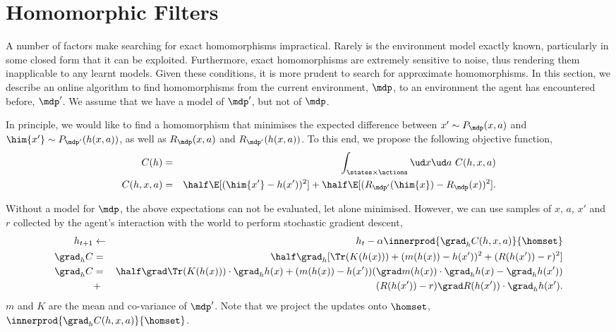 \section{Homomorphic Filters}
\label{sec:hf:homomorphic-filters}

A number of factors make searching for exact homomorphisms impractical.
Rarely is the environment model exactly known, particularly in some
closed form that it can be exploited. Furthermore, exact homomorphisms
are extremely sensitive to noise, thus rendering them inapplicable to
any learnt models. Given these conditions, it is more prudent to search
for approximate homomorphisms. In this section, we describe an online
algorithm to find homomorphisms from the current environment, $\mdp$, to
an environment the agent has encountered before, $\mdp'$. We assume that
we have a model of $\mdp'$, but not of $\mdp$. 


In principle, we would like to find a homomorphism that minimises the
expected difference between $x' \sim P_{\mdp}(x,a)$ and $\him{x'} \sim
P_{\mdp'}(h(x,a))$, as well as $R_{\mdp}(x,a)$ and $R_{\mdp'}(h(x,a))$.
To this end, we propose the following objective function,
\begin{eqnarray}
  C(h) &=& \int_{\states \times \actions} \ud x \ud a ~ C(h,x,a) \label{eq:hf:cost}\\
  C(h,x,a) &=& \half \E[ (\him{x'} - h(x'))^2 ] + \half \E[ (R_{\mdp'}(\him{x}) - R_{\mdp}(x))^2 ] \nonumber.
\end{eqnarray}

Without a model for $\mdp$, the above expectations can not be evaluated,
let alone minimised. However, we can use samples of $x$, $a$, $x'$ and
$r$ collected by the agent's interaction with the world to perform
stochastic gradient descent,
\begin{eqnarray*}
  h_{t+1} &\gets& h_{t} - \alpha \innerprod{\grad_h C(h,x,a)}{\homset} \\
  \grad_h C &=& \half \grad_h [ \Tr( K( h(x) ) ) + ( m( h(x) ) - h(x') )^2 + ( R(h(x')) - r )^2   ] \\ 
  \grad_h C &=& \half \grad \Tr( K(h(x)) )\cdot \grad_h h(x) + (m(h(x)) - h(x')) ( \grad m(h(x)) \cdot \grad_h h(x) - \grad_h h(x') )  \\
            &+& ( R(h(x')) - r ) \grad R( h(x') )\cdot \grad_h h(x').
\end{eqnarray*}
$m$ and $K$ are the mean and co-variance of $\mdp'$. Note that we
project the updates onto $\homset$, $\innerprod{\grad_h
C(h,x,a)}{\homset}$.

